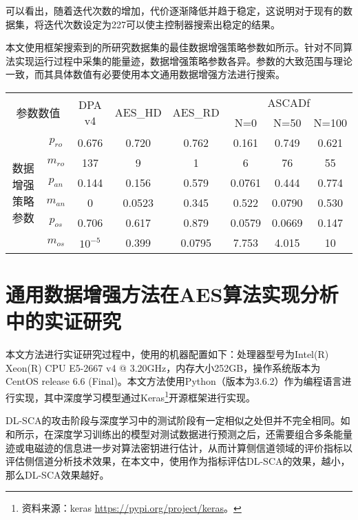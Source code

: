 {	可以看出，随着迭代次数的增加，代价逐渐降低并趋于稳定，这说明对于现有的数据集，将迭代次数设定为227可以使主控制器搜索出稳定的结果。
	
	本文使用框架搜索到的所研究数据集的最佳数据增强策略参数如所示。针对不同算法实现运行过程中采集的能量迹，数据增强策略参数各异。参数的大致范围与理论一致，而其具体数值有必要使用本文通用数据增强方法进行搜索。
	
	\begin{table}[!h]
		\label{tab:paras}
		\centering
		\small 
		\begin{tabular}{cccccccc}
			\hline
			\multicolumn{2}{c}{\multirow{2}{*}{参数数值}} &\multirow{2}{*}{DPA v4}&\multirow{2}{*}{AES\_HD}&\multirow{2}{*}{AES\_RD}& \multicolumn{3}{c}{ASCADf} \\
			\multicolumn{2}{c}{}&&&&N=0 & N=50 & N=100 \\
			\hline
			\multirow{6}{*}{数据增强策略参数}
			&$p_{ro}$&0.676&0.720&0.762&0.161&0.749&0.621\\
			&$m_{ro}$&137&9&1&6&76&55\\
			&$p_{an}$&0.144&0.156&0.579&0.0761&0.444&0.774\\
			&$m_{an}$&   0&0.0523&0.345&0.522&0.0790&0.530\\
			&$p_{os}$&0.706&0.617&0.879&0.0579&0.0669&0.147\\
			&$m_{os}$&$10^{-5}$&0.399&0.0795&7.753&4.015&10\\
			\hline
			
		\end{tabular}   
	\end{table}

	\section{通用数据增强方法在AES算法实现分析中的实证研究}\label{sec:realexp}
	
	本文方法进行实证研究过程中，使用的机器配置如下：处理器型号为Intel(R) Xeon(R) CPU E5-2667 v4 @ 3.20GHz，内存大小252GB，操作系统版本为CentOS release 6.6 (Final)。本文方法使用Python（版本为3.6.2）作为编程语言进行实现，其中深度学习模型通过Keras\footnote{资料来源：keras \href{https://pypi.org/project/keras}{https://pypi.org/project/keras}。}开源框架进行实现。

	DL-SCA的攻击阶段与深度学习中的测试阶段有一定相似之处但并不完全相同。如和所示，在深度学习训练出的模型对测试数据进行预测之后，还需要组合多条能量迹或电磁迹的信息进一步对算法密钥进行估计，从而计算侧信道领域的评价指标以评估侧信道分析技术效果，在本文中，使用\chenggongtiaoshu 作为指标评估DL-SCA的效果，\chenggongtiaoshu 越小，那么DL-SCA效果越好。

}
